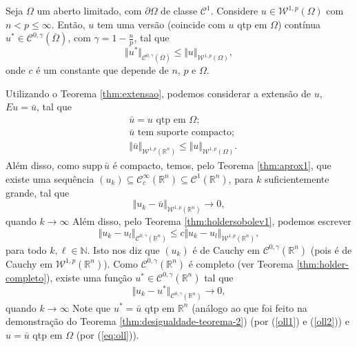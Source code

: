 \documentclass[a4paper, 11pt]{book}
\theoremstyle{definition}
\newcommand{\bN}{\mathbb{N}}
\newcommand{\bR}{\mathbb{R}}
\newcommand{\cC}{\mathcal{C}}
\newcommand{\cW}{\mathcal{W}}
\newcommand{\supp}{\mathrm{supp}\,}
\begin{document}
\begin{tbox}
    Seja $\Omega$ um aberto limitado, com $\partial\Omega$ de classe $\cC^1$.
    Considere $u \in \cW^{1,p}(\Omega)$ com $n < p \leqslant \infty$.
    Então, $u$ tem uma versão (coincide com $u$ qtp em $\Omega$) contínua $u^* \in \cC^{0,\gamma}(\overline\Omega)$, com $\gamma = 1 - \frac{n}{p}$, tal que
    \[
        \Vert u^*  \Vert_{\cC^{0,\gamma}(\overline\Omega)} \leqslant \Vert u \Vert_{\cW^{1,p}(\Omega)},
    \]
    onde $c$ é um constante que depende de $n$, $p$ e $\Omega$.
\end{tbox}
\begin{prf}
    Utilizando o Teorema \ref{thm:extensao}, podemos considerar a extensão de $u$, $Eu = \bar u$, tal que
    \begin{equation} \label{eq:oll}
        \begin{aligned}
            &\bar u = u \text{ qtp em } \Omega;\\
            &\bar u \text{ tem suporte compacto};\\
            &\Vert \bar u \Vert_{\cW^{1,p}(\bR^n)} \leqslant \Vert u \Vert_{\cW^{1,p}(\Omega)}.
        \end{aligned}
    \end{equation}
    Além disso, como $\supp \bar u$ é compacto, temos, pelo Teorema \ref{thm:aprox1}, que existe uma sequência $(u_k) \subseteq \cC^\infty_c(\bR^n) \subseteq \cC^1(\bR^n)$, para $k$ suficientemente grande, tal que
    \begin{equation} \label{eq:oll1}
        \Vert u_k - \bar u \Vert_{\cW^{1,p}(\bR^n)} \to 0,
    \end{equation}
    quando $k \to \infty$
    Além disso, pelo Teorema \ref{thm:holdersobolev1}, podemos escrever
    \[
        \Vert u_k -u_l \Vert_{\cC^{0,\gamma}(\bR^n)} \leqslant c \Vert u_k - u_l \Vert_{\cW^{1,p}(\bR^n)},
    \]
    para todo $k, \ell \in \bN$.
    Isto nos diz que $(u_k)$ é de Cauchy em $\cC^{0,\gamma}(\bR^n)$ (pois é de Cauchy em $\cW^{1,p}(\bR^n)$).
    Como $\cC^{0,\gamma}(\bR^n)$ é completo (ver Teorema \ref{thm:holder-completo}), existe uma função $u^* \in \cC^{0,\gamma}(\bR^n)$ tal que
    \begin{equation} \label{eq:oll2}
        \Vert u_k - u^* \Vert_{\cC^{0,\gamma}(\bR^n)} \to 0,
    \end{equation}
    quando $k \to \infty$
    Note que $u^* = \bar u$ qtp em $\bR^n$ (análogo ao que foi feito na demonstração do Teorema \ref{thm:desigualdade-teorema-2}) (por (\ref{oll1}) e (\ref{oll2})) e $u = \bar u$ qtp em $\Omega$ (por (\ref{eq:oll})).

\end{prf}
\end{document}
